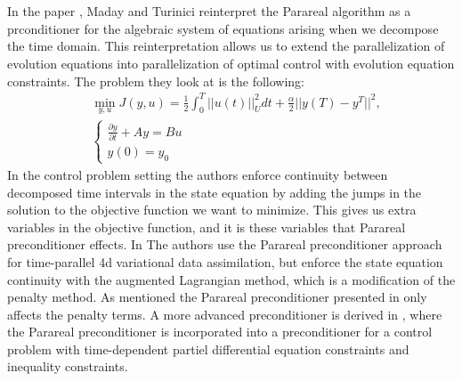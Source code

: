 \\
\\
In the paper \cite{maday2002parareal}, Maday and Turinici reinterpret the Parareal algorithm as a prconditioner for the algebraic system of equations arising when we decompose the time domain. This reinterpretation allows us to extend the parallelization of evolution equations into parallelization of optimal control with evolution equation constraints. The problem they look at is the following:
\begin{align*}
&\min_{y,u}J(y,u) = \frac{1}{2}\int_0^T||u(t)||_U^2dt + \frac{\alpha}{2}||y(T)-y^T||^2,\\
&\left\{
     \begin{array}{lr}
       	\frac{\partial y}{\partial t}+Ay = Bu\\
       	   y(0)=y_0
     \end{array}
   \right.
\end{align*}
In the control problem setting the authors enforce continuity between decomposed time intervals in the state equation by adding the jumps in the solution to the objective function we want to minimize. This gives us extra variables in the objective function, and it is these variables that Parareal preconditioner effects. In \cite{rao2016time} The authors use the Parareal preconditioner approach for time-parallel 4d variational data assimilation, but enforce the state equation continuity with the augmented Lagrangian method, which is a modification of the penalty method\cite{nocedal2006numerical}. As mentioned the Parareal preconditioner presented in \cite{maday2002parareal} only affects the penalty terms. A more advanced preconditioner is derived in \cite{ulbrich2015preconditioners}, where the Parareal preconditioner is incorporated into a preconditioner for a control problem with time-dependent partiel differential equation constraints and inequality constraints.